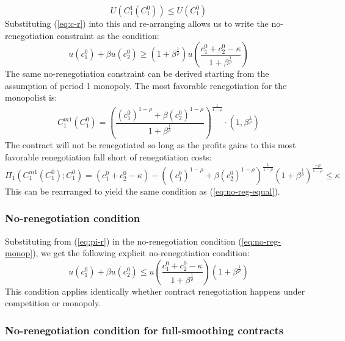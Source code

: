 \documentclass[11pt,english]{article}
\theoremstyle{plain}
\theoremstyle{definition}
\begin{document}
\begin{equation}
U(C_{1}^{1}\left(C_{1}^{0}\right))\le U(C_{1}^{0})\label{eq:uc-r}
\end{equation}
Substituting (\ref{eq:c-r}) into this and re-arranging allows us to
write the no-renegotiation constraint as the condition:
\begin{equation}
u(c_{1}^{0})+\beta u(c_{2}^{0})\ge(1+\beta^{\frac{1}{\rho}})u\left(\frac{c_{1}^{0}+c_{2}^{0}-\kappa}{1+\beta^{\frac{1}{\rho}}}\right)\label{eq:no-reg-equal}
\end{equation}
The same no-renegotiation constraint can be derived starting from
the assumption of period 1 monopoly. The most favorable renegotiation
for the monopolist is:
\begin{equation}
C_{1}^{m1}\left(C_{1}^{0}\right)=\left(\frac{(c_{1}^{0})^{1-\rho}+\beta(c_{2}^{0})^{1-\rho}}{1+\beta^{\frac{1}{\rho}}}\right)^{\frac{1}{1-\rho}}\cdot\left(1,\beta^{\frac{1}{\rho}}\right)\label{eq:m-r}
\end{equation}
The contract will not be renegotiated so long as the profits gains
to this most favorable renegotiation fall short of renegotiation costs:
\begin{equation}
\Pi_{1}\left(C_{1}^{m1}\left(C_{1}^{0}\right);C_{1}^{0}\right)=\left(c_{1}^{0}+c_{2}^{0}-\kappa\right)-\left((c_{1}^{0})^{1-\rho}+\beta(c_{2}^{0})^{1-\rho}\right)^{\frac{1}{1-\rho}}\left(1+\beta^{\frac{1}{\rho}}\right)^{\frac{-\rho}{1-\rho}}\le\kappa\label{eq:pi-r}
\end{equation}
This can be rearranged to yield the same condition as (\ref{eq:no-reg-equal}).

\subsubsection{No-renegotiation condition}

Substituting from (\ref{eq:pi-r}) in the no-renegotiation condition
(\ref{eq:no-reg-monop}), we get the following explicit no-renegotiation
condition: 
\begin{equation}
u(c_{1}^{0})+\beta u(c_{2}^{0})\le u\left(\frac{c_{1}^{0}+c_{2}^{0}-\kappa}{1+\beta^{\frac{1}{\rho}}}\right)(1+\beta^{\frac{1}{\rho}})\label{eq:no-renegotiation}
\end{equation}
This condition applies identically whether contract renegotiation
happens under competition or monopoly.

\subsubsection{No-renegotiation condition for full-smoothing contracts}
\end{document}
